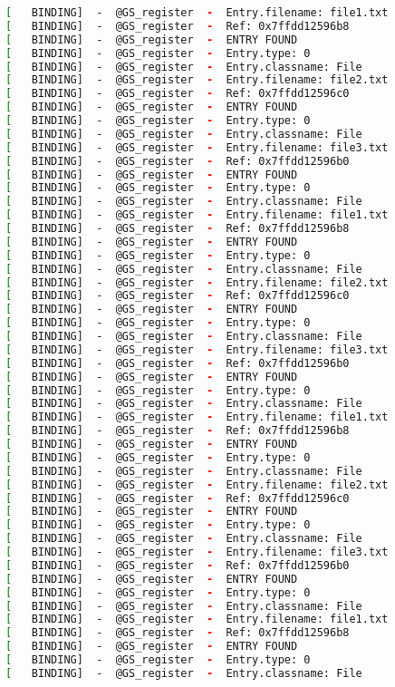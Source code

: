 \begin{lstlisting}[language=bash]
[   BINDING]  -  @GS_register  -  Entry.filename: file1.txt
[   BINDING]  -  @GS_register  -  Ref: 0x7ffdd12596b8
[   BINDING]  -  @GS_register  -  ENTRY FOUND
[   BINDING]  -  @GS_register  -  Entry.type: 0
[   BINDING]  -  @GS_register  -  Entry.classname: File
[   BINDING]  -  @GS_register  -  Entry.filename: file2.txt
[   BINDING]  -  @GS_register  -  Ref: 0x7ffdd12596c0
[   BINDING]  -  @GS_register  -  ENTRY FOUND
[   BINDING]  -  @GS_register  -  Entry.type: 0
[   BINDING]  -  @GS_register  -  Entry.classname: File
[   BINDING]  -  @GS_register  -  Entry.filename: file3.txt
[   BINDING]  -  @GS_register  -  Ref: 0x7ffdd12596b0
[   BINDING]  -  @GS_register  -  ENTRY FOUND
[   BINDING]  -  @GS_register  -  Entry.type: 0
[   BINDING]  -  @GS_register  -  Entry.classname: File
[   BINDING]  -  @GS_register  -  Entry.filename: file1.txt
[   BINDING]  -  @GS_register  -  Ref: 0x7ffdd12596b8
[   BINDING]  -  @GS_register  -  ENTRY FOUND
[   BINDING]  -  @GS_register  -  Entry.type: 0
[   BINDING]  -  @GS_register  -  Entry.classname: File
[   BINDING]  -  @GS_register  -  Entry.filename: file2.txt
[   BINDING]  -  @GS_register  -  Ref: 0x7ffdd12596c0
[   BINDING]  -  @GS_register  -  ENTRY FOUND
[   BINDING]  -  @GS_register  -  Entry.type: 0
[   BINDING]  -  @GS_register  -  Entry.classname: File
[   BINDING]  -  @GS_register  -  Entry.filename: file3.txt
[   BINDING]  -  @GS_register  -  Ref: 0x7ffdd12596b0
[   BINDING]  -  @GS_register  -  ENTRY FOUND
[   BINDING]  -  @GS_register  -  Entry.type: 0
[   BINDING]  -  @GS_register  -  Entry.classname: File
[   BINDING]  -  @GS_register  -  Entry.filename: file1.txt
[   BINDING]  -  @GS_register  -  Ref: 0x7ffdd12596b8
[   BINDING]  -  @GS_register  -  ENTRY FOUND
[   BINDING]  -  @GS_register  -  Entry.type: 0
[   BINDING]  -  @GS_register  -  Entry.classname: File
[   BINDING]  -  @GS_register  -  Entry.filename: file2.txt
[   BINDING]  -  @GS_register  -  Ref: 0x7ffdd12596c0
[   BINDING]  -  @GS_register  -  ENTRY FOUND
[   BINDING]  -  @GS_register  -  Entry.type: 0
[   BINDING]  -  @GS_register  -  Entry.classname: File
[   BINDING]  -  @GS_register  -  Entry.filename: file3.txt
[   BINDING]  -  @GS_register  -  Ref: 0x7ffdd12596b0
[   BINDING]  -  @GS_register  -  ENTRY FOUND
[   BINDING]  -  @GS_register  -  Entry.type: 0
[   BINDING]  -  @GS_register  -  Entry.classname: File
[   BINDING]  -  @GS_register  -  Entry.filename: file1.txt
[   BINDING]  -  @GS_register  -  Ref: 0x7ffdd12596b8
[   BINDING]  -  @GS_register  -  ENTRY FOUND
[   BINDING]  -  @GS_register  -  Entry.type: 0
[   BINDING]  -  @GS_register  -  Entry.classname: File

\end{lstlisting}
